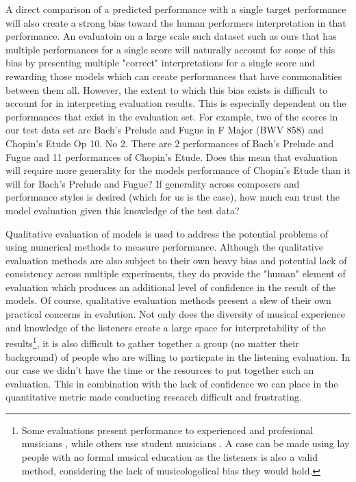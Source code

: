 A direct comparison of a predicted performance with a single target performance will also create a strong bias toward the human performers interpretation in that performance. An evaluatoin on a large scale such dataset such as ours that has multiple performances for a single score will naturally account for some of this bias by presenting multiple "correct" interpretations for a single score and rewarding those models which can create performances that have commonalities between them all. However, the extent to which this bias exists is difficult to account for in interpreting evaluation results. This is especially dependent on the performances that exist in the evaluation set. For example, two of the scores in our test data set are Bach's Prelude and Fugue in F Major (BWV 858) and Chopin's Etude Op 10. No 2. There are 2 performances of Bach's Prelude and Fugue and 11 performances of Chopin's Etude. Does this mean that evaluation will require more generality for the models performance of Chopin's Etude than it will for Bach's Prelude and Fugue? If generality across composers and performance styles is desired (which for us is the case), how much can trust the model evaluation given this knowledge of the test data? 

Qualitative evaluation of models is used to address the potential problems of using numerical methods to measure performance. Although the qualitative evaluation methods are also subject to their own heavy bias and potential lack of consistency across multiple experiments, they do provide the "human" element of evaluation which produces an additional level of confidence in the result of the models. Of course, qualitative evaluation methods present a slew of their own practical concerns in evalution. Not only does the diversity of musical experience and knowledge of the listeners create a large space for interpretability of the results\footnote{Some evaluations present performance to experienced and profesional musicians \cite{oore2020time}, while others use student musicians \cite{jeong2019virtuosonet}. A case can be made using lay people with no formal musical education as the listeners is also a valid method, considering the lack of musicologolical bias they would hold.}, it is also difficult to gather together a group (no matter their background) of people who are willing to particpate in the listening evaluation. In our case we didn't have the time or the resources to put together such an evaluation. This in combination with the lack of confidence we can place in the quantitative metric made conducting research difficult and frustrating. 

